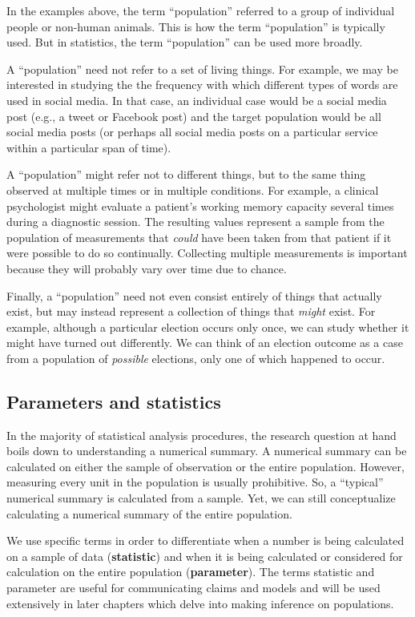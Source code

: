 \documentclass[
  10pt,
  openany]{book}
\begin{document}
In the examples above, the term ``population'' referred to a group of individual people or non-human animals. This is how the term ``population'' is typically used. But in statistics, the term ``population'' can be used more broadly.

A ``population'' need not refer to a set of living things. For example, we may be interested in studying the the frequency with which different types of words are used in social media. In that case, an individual case would be a social media post (e.g., a tweet or Facebook post) and the target population would be all social media posts (or perhaps all social media posts on a particular service within a particular span of time).

A ``population'' might refer not to different things, but to the same thing observed at multiple times or in multiple conditions. For example, a clinical psychologist might evaluate a patient's working memory capacity several times during a diagnostic session. The resulting values represent a sample from the population of measurements that \emph{could} have been taken from that patient if it were possible to do so continually. Collecting multiple measurements is important because they will probably vary over time due to chance.

Finally, a ``population'' need not even consist entirely of things that actually exist, but may instead represent a collection of things that \emph{might} exist. For example, although a particular election occurs only once, we can study whether it might have turned out differently. We can think of an election outcome as a case from a population of \emph{possible} elections, only one of which happened to occur.

\hypertarget{parameters-and-statistics}{%
\subsection{Parameters and statistics}\label{parameters-and-statistics}}

In the majority of statistical analysis procedures, the research question at hand boils down to understanding a numerical summary.
A numerical summary can be calculated on either the sample of observation or the entire population.
However, measuring every unit in the population is usually prohibitive.
So, a ``typical'' numerical summary is calculated from a sample.
Yet, we can still conceptualize calculating a numerical summary of the entire population.

We use specific terms in order to differentiate when a number is being calculated on a sample of data (\textbf{statistic}) and when it is being calculated or considered for calculation on the entire population (\textbf{parameter}).
The terms statistic and parameter are useful for communicating claims and models and will be used extensively in later chapters which delve into making inference on populations.
\end{document}
